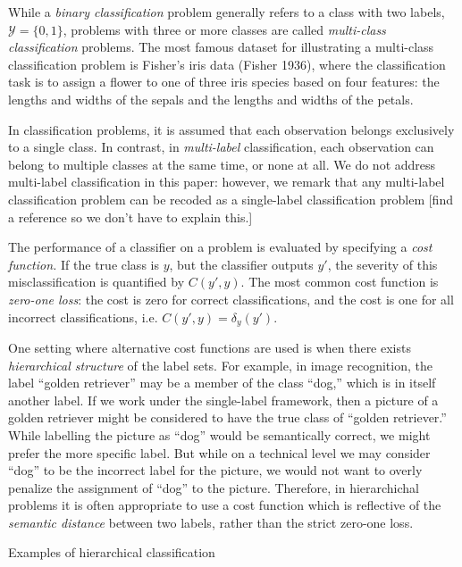 \documentclass[12pt]{article}
\begin{document}
While a \emph{binary classification} problem generally refers to a
class with two labels, $\mathcal{Y} = \{0, 1\}$, problems with three
or more classes are called \emph{multi-class classification} problems.
The most famous dataset for illustrating a multi-class classification
problem is Fisher's iris data (Fisher 1936), where the classification
task is to assign a flower to one of three iris species based on four
features: the lengths and widths of the sepals and the lengths and
widths of the petals.

In classification problems, it is assumed that each observation
belongs exclusively to a single class.  In contrast,
in \emph{multi-label} classification, each observation can belong to
multiple classes at the same time, or none at all.  We do not address
multi-label classification in this paper: however, we remark that any
multi-label classification problem can be recoded as a single-label
classification problem [find a reference so we don't have to explain
this.]

The performance of a classifier on a problem is evaluated by
specifying a \emph{cost function.}  If the true class is $y$, but the
classifier outputs $y'$, the severity of this misclassification is
quantified by $C(y', y)$.  The most common cost function
is \emph{zero-one loss}: the cost is zero for correct classifications,
and the cost is one for all incorrect classifications, i.e. $C(y', y)
= \delta_{y}(y').$

One setting where alternative cost functions are used is when there
exists \emph{hierarchical structure} of the label sets.  For example,
in image recognition, the label ``golden retriever'' may be a member
of the class ``dog,'' which is in itself another label.  If we work
under the single-label framework, then a picture of a golden retriever
might be considered to have the true class of ``golden retriever.''
While labelling the picture as ``dog'' would be semantically correct,
we might prefer the more specific label.  But while on a technical
level we may consider ``dog'' to be the incorrect label for the
picture, we would not want to overly penalize the assignment of
``dog'' to the picture.  Therefore, in hierarchichal problems it is
often appropriate to use a cost function which is reflective of
the \emph{semantic distance} between two labels, rather than the
strict zero-one loss.

Examples of hierarchical classification 
\end{document}

